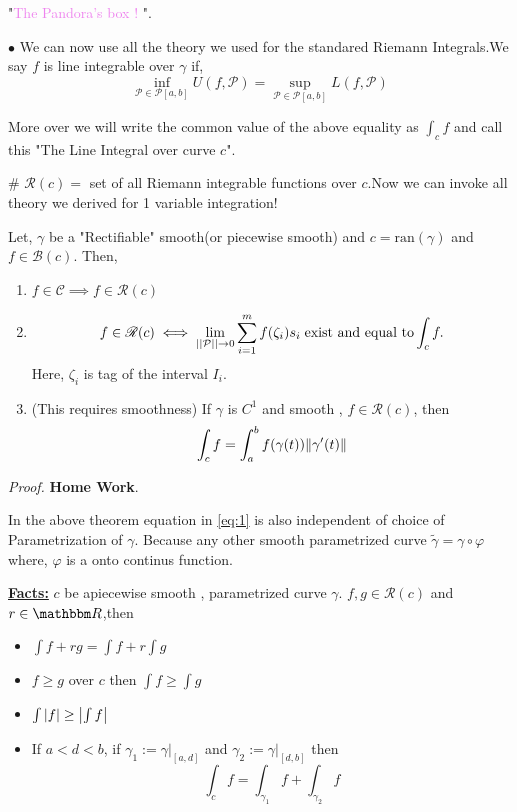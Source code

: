 \documentclass[Analysis-3]{subfiles}
\begin{document}
"\textcolor{violet}{The Pandora's box !} ".
\vspace{0.3cm}

$\bullet$ We can now use all the theory we used for the standared Riemann Integrals.We say $f$ is line integrable over $\gamma$ if,
\[\inf_{\mathcal{P} \in \mathscr{P}[a,b]} U(f,\mathcal{P}) = \sup_{\mathcal{P} \in \mathscr{P}[a,b]} L(f,\mathcal{P})\]

More over we will write the common value of the above equality as $\int_c f$ and call this "The Line Integral over curve $c$".

\# \textbf{$\mathscr{R}(c)=$} set of all Riemann integrable functions over $c$.Now we can invoke all theory we derived for 1 variable integration!

\begin{Thm}{}{}\label{thm1:23}
    Let, $\gamma$ be a "Rectifiable" smooth(or piecewise smooth) and $c = \text{ran}(\gamma)$ and $f \in \mathscr{B}(c)$. Then,
    \begin{enumerate}
        \item $f \in \mathscr{C} \implies f \in \mathscr{R}(c)$
        \item \[ f \in \mathscr{R}(c) \iff \lim_{||\mathcal{P}||\to 0} \sum_{i=1}^{m} f(\zeta_i)s_i \hspace{0.1cm} \text{exist and equal to}\int_c f.\] Here, $\zeta_i$ is tag of the interval $I_i$.

        \item (This requires smoothness) If $\gamma$ is $C^1$ and smooth , $f \in \mathscr{R}(c)$, then
              \[\int_c f = \int_a^b f(\gamma(t))\norm{\gamma'(t)} \label{eq:1}\]

    \end{enumerate}
\end{Thm}

\textit{Proof.} \textbf{Home Work}.

\vspace{0.2cm}

In the above theorem equation in \ref{eq:1} is also independent of choice of Parametrization of $\gamma$. Because any other smooth parametrized curve $\tilde{\gamma} = \gamma \circ \varphi$ where, $\varphi$ is a onto continus function.

\vspace{1cm}

\textbf{\underline{Facts:}} $c$ be apiecewise smooth , parametrized curve $\gamma$. $f,g \in \mathscr{R}(c)$ and $r \in \R$,then
\begin{itemize}
    \item $\int f+rg = \int f + r\int g $
    \item $f \ge g$ over $c$ then $\int f \ge \int g$
    \item $\int \abs{f} \ge \abs{\int f}$
    \item If $a<d<b$, if $\gamma_1 := \gamma |_{[a,d]}$ and $\gamma_2 := \gamma |_{[d,b]}$ then
          \[\int_c f = \int_{\gamma_1}f + \int_{\gamma_2} f \]
\end{itemize}
\end{document}
